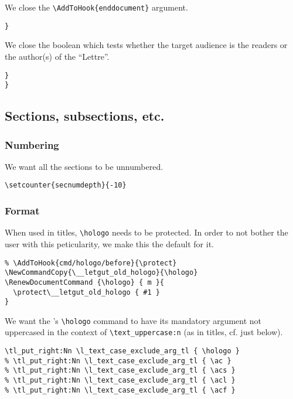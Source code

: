 \documentclass{letgut}
\begin{document}
We close the \lstinline+\AddToHook{enddocument}+ argument.

\begin{lstlisting}
}
\end{lstlisting}

We close the boolean which tests whether the target audience is the readers or
the author(s) of the “Lettre”.

\begin{lstlisting}
}
}
\end{lstlisting}

\subsection{Sections, subsections, etc.}
\label{ImplementationSectionssubsectionsetc-vzng55h0jlj0}
\subsubsection{Numbering}
\label{ImplementationSectionssubsectionsetcNumbering-lmog55h0jlj0}
We want all the sections to be unnumbered.

\begin{lstlisting}
\setcounter{secnumdepth}{-10}
\end{lstlisting}

\subsubsection{Format}
\label{ImplementationSectionssubsectionsetcFormat-tapg55h0jlj0}
When used in titles, \lstinline+\hologo+ needs to be protected. In order to not bother the
user with this peticularity, we make this the default for it.

\begin{lstlisting}
% \AddToHook{cmd/hologo/before}{\protect}
\NewCommandCopy{\__letgut_old_hologo}{\hologo}
\RenewDocumentCommand {\hologo} { m }{
  \protect\__letgut_old_hologo { #1 }
}
\end{lstlisting}

We want the 's \lstinline+\hologo+ command to have its mandatory argument
not uppercased in the context of \lstinline+\text_uppercase:n+ (as in titles, cf. just
below).

\begin{lstlisting}
\tl_put_right:Nn \l_text_case_exclude_arg_tl { \hologo }
% \tl_put_right:Nn \l_text_case_exclude_arg_tl { \ac }
% \tl_put_right:Nn \l_text_case_exclude_arg_tl { \acs }
% \tl_put_right:Nn \l_text_case_exclude_arg_tl { \acl }
% \tl_put_right:Nn \l_text_case_exclude_arg_tl { \acf }
\end{lstlisting}
\end{document}
